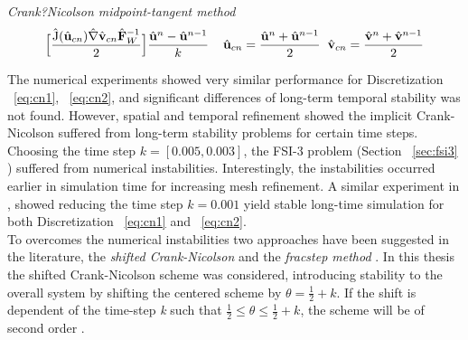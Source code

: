 \begin{discr}
\textit{Crank?Nicolson midpoint-tangent method}
\begin{align*}
\Big[\frac{\text{\^{J}}(\hat{\mathbf{u}}_{cn}) \hat{\mathbf{\nabla}} \hat{\mathbf{v}}_{cn} \hat{\mathbf{F}}_W^{-1}}{2} \Big] 
\frac{\hat{\mathbf{u}}^{n} - \hat{\mathbf{u}}^{n-1}}{k} \hspace{4mm}
\hat{\mathbf{u}}_{cn} = \frac{\hat{\mathbf{u}}^{n} + \hat{\mathbf{u}}^{n-1}}{2} \hspace{2mm}
\hat{\mathbf{v}}_{cn} = \frac{\hat{\mathbf{v}}^{n} + \hat{\mathbf{v}}^{n-1}}{2}
\end{align*} 
\label{eq:cn2}
\end{discr}
\newpage
The numerical experiments showed very similar performance for Discretization  ~\ref{eq:cn1}, ~\ref{eq:cn2}, and significant differences of long-term temporal stability was not found. However, spatial and temporal refinement showed the implicit Crank-Nicolson suffered from long-term stability problems for certain time steps. Choosing the time step $k = [0.005, 0.003]$, the FSI-3 problem (Section  ~\ref{sec:fsi3} ) suffered from numerical instabilities. Interestingly, the instabilities occurred earlier in simulation time for increasing mesh refinement. A similar experiment in  \cite{Wicka}, showed reducing the time step $k = 0.001$  yield stable long-time simulation for both  Discretization  ~\ref{eq:cn1} and ~\ref{eq:cn2}. \\
To overcomes the numerical instabilities two approaches have been suggested in the literature,  the \textit{shifted Crank-Nicolson}  and the \textit{fracstep method}  \cite{Richter2015, Wicka, Wick2013a}.  In this thesis the shifted Crank-Nicolson scheme was considered, introducing stability to the overall system by shifting the centered scheme  by $\theta = \frac{1}{2} + k$. If the shift is dependent of the time-step \textit{k} such that $\frac{1}{2} \leq \theta \leq \frac{1}{2} + k$, the scheme will be of second order \cite{Richter2015}. \\
